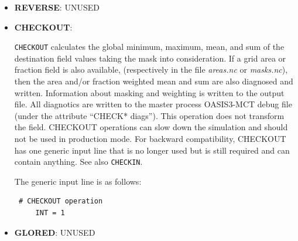 \begin{itemize}
\item {\bf REVERSE}: UNUSED

\item {\bf CHECKOUT}:

  {\tt CHECKOUT} calculates the global minimum, maximum, mean, and 
  sum of the destination field values taking the mask into consideration.  If a grid area
  or fraction field is also available, (respectively in the file {\it
    areas.nc} or {\it masks.nc}), then the area and/or fraction weighted
  mean and sum are also diagnosed and written.  Information about masking
  and weighting is written to the output file.  All diagnotics are
  written to the master  process OASIS3-MCT debug file (under the attribute ``CHECK* diags'').
  This operation does not transform the field. CHECKOUT operations can
  slow down the simulation and should not be used in
  production mode.  For backward compatibility, CHECKOUT has one generic
  input line that is no longer used but is still required and can contain anything.
  See also {\tt CHECKIN}.

  The generic input line is as follows:
 \begin{verbatim}
 # CHECKOUT operation
     INT = 1  
\end{verbatim} 

\item {\bf GLORED}: UNUSED

\end{itemize}


